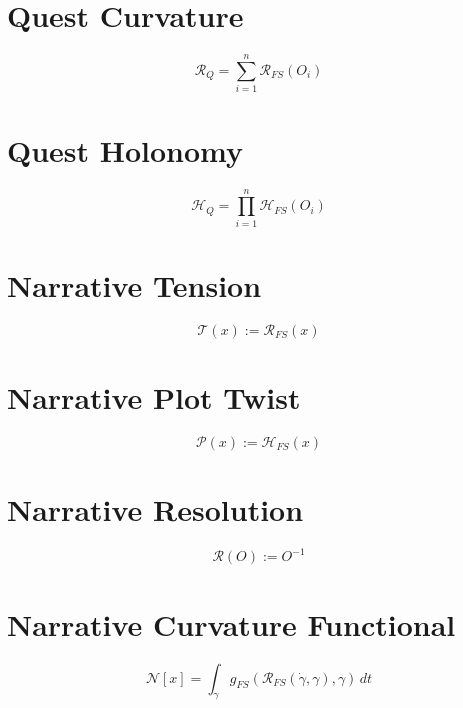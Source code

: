 
\section*{Quest Curvature}

\[
\mathcal{R}_Q
= \sum_{i=1}^{n}
\mathcal{R}_{FS}(O_i)
\]


\section*{Quest Holonomy}

\[
\mathcal{H}_Q
= \prod_{i=1}^{n}
\mathcal{H}_{FS}(O_i)
\]


\section*{Narrative Tension}

\[
\mathcal{T}(x) := \mathcal{R}_{FS}(x)
\]


\section*{Narrative Plot Twist}

\[
\mathcal{P}(x) := \mathcal{H}_{FS}(x)
\]


\section*{Narrative Resolution}

\[
\mathcal{R}(O) := O^{-1}
\]


\section*{Narrative Curvature Functional}

\[
\mathcal{N}[x]
= \int_{\gamma}
g_{FS}(\mathcal{R}_{FS}(\dot{\gamma},\gamma), \gamma)\, dt
\]

